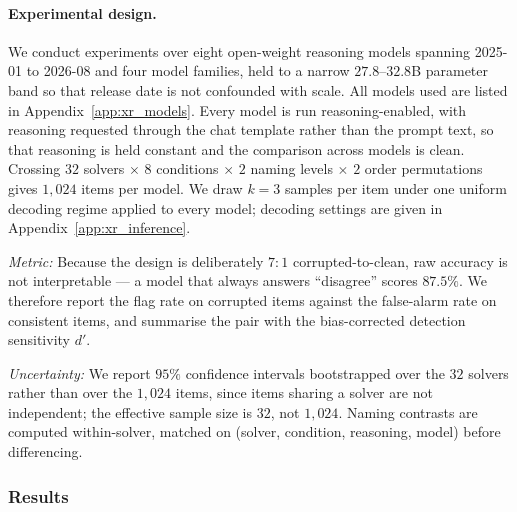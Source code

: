 \paragraph{Experimental design.}
We conduct experiments over eight open-weight reasoning models spanning
2025-01 to 2026-08 and four model families, held to a narrow $27.8$--$32.8$B
parameter band so that release date is not confounded with scale. All models used
are listed in Appendix~\ref{app:xr_models}. Every model is run reasoning-enabled,
with reasoning requested through the chat template rather than the prompt text, so
that reasoning is held constant and the comparison across models is clean. Crossing
$32$ solvers $\times$ $8$ conditions $\times$ $2$ naming levels $\times$ $2$ order
permutations gives $1{,}024$ items per model. We draw $k = 3$ samples per item under
one uniform decoding regime applied to every model; decoding settings are given in
Appendix~\ref{app:xr_inference}.

\emph{Metric:} Because the design is deliberately $7{:}1$ corrupted-to-clean, raw
accuracy is not interpretable --- a model that always answers ``disagree'' scores
$87.5\%$. We therefore report the flag rate on corrupted items against the
false-alarm rate on consistent items, and summarise the pair with the bias-corrected
detection sensitivity $d'$.

\emph{Uncertainty:} We report $95\%$ confidence intervals bootstrapped over the $32$
solvers rather than over the $1{,}024$ items, since items sharing a solver are not
independent; the effective sample size is $32$, not $1{,}024$. Naming contrasts are
computed within-solver, matched on (solver, condition, reasoning, model) before
differencing.

\subsubsection*{Results}

